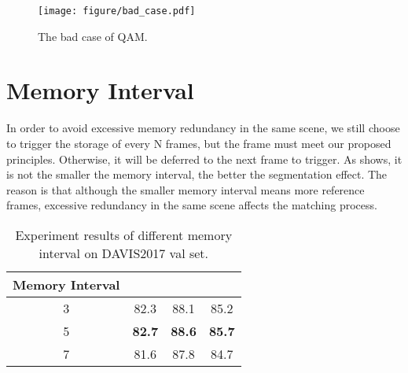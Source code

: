 \documentclass[runningheads]{llncs}
\begin{document}
    \begin{figure}[t]
      \centering
      \texttt{[image: figure/bad\_case.pdf]}
      \caption{The bad case of QAM.}
      \label{bad_case}
    \end{figure}
    
\section{Memory Interval}
    In order to avoid excessive memory redundancy in the same scene, 
    we still choose to trigger the storage of every N frames, but the frame must meet our proposed principles. 
    Otherwise, it will be deferred to the next frame to trigger. 
    As  shows, it is not the smaller the memory interval, the better the segmentation effect. 
The reason is that although the smaller memory interval means more reference frames, excessive redundancy in the same scene affects the matching process.
    \begin{table}[h]
\renewcommand\tabcolsep{5pt}
    \footnotesize
    \centering
    \caption{Experiment results of different memory interval on DAVIS2017 val set.}
    \label{memory interval}
\begin{tabular}{cccc}
    \toprule[1.5pt]
    Memory Interval &  & &  \\ \midrule
    3               & 82.3 & 88.1 & 85.2 \\
    5               & \textbf{82.7} & \textbf{88.6} & \textbf{85.7} \\
    7               & 81.6 & 87.8 & 84.7 \\ \bottomrule[1.5pt]
    \end{tabular}
    \end{table}
    
    
%
  
\end{document}
